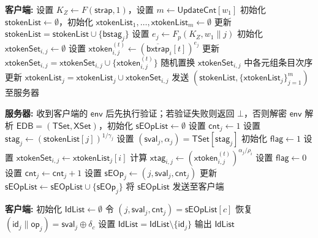 \begin{breakablealgorithm}
\caption{搜索流程 $\mathsf{Search}$}
\label{alg:sse-search}
\begin{algorithmic}[1]
\item[] \textbf{客户端:}
\STATE 设置 $K_Z \leftarrow F(\mathsf{strap},1)$，设置 $m \leftarrow \mathsf{UpdateCnt}[w_1]$
\STATE 初始化 $\mathsf{stokenList}\leftarrow\emptyset$，初始化 $\mathsf{xtokenList}_1,\ldots,\mathsf{xtokenList}_m\leftarrow\emptyset$
  \STATE 更新 $\mathsf{stokenList}=\mathsf{stokenList}\cup\{\mathsf{bstag}_j\}$
  \STATE 设置 $e_j\leftarrow F_p(K_Z,w_1\|j)$
    \STATE 初始化 $\mathsf{xtokenSet}_{i,j}\leftarrow\emptyset$
      \STATE 设置 $\mathsf{xtoken}_{i,j}^{(t)}\leftarrow (\overline{\mathsf{bxtrap}}_i[t])^{e_j}$
      \STATE 更新 $\mathsf{xtokenSet}_{i,j}=\mathsf{xtokenSet}_{i,j}\cup\{\mathsf{xtoken}_{i,j}^{(t)}\}$
    \ENDFOR
    \STATE 随机置换 $\mathsf{xtokenSet}_{i,j}$ 中各元组条目次序
    \STATE 更新 $\mathsf{xtokenList}_j=\mathsf{xtokenList}_j\cup\mathsf{xtokenSet}_{i,j}$
  \ENDFOR
\ENDFOR
\STATE 发送 $(\mathsf{stokenList},\{\mathsf{xtokenList}_j\}_{j=1}^{m})$ 至服务器
\item[] \textbf{服务器:}
\STATE 收到客户端的 $\mathsf{env}$ 后先执行验证；若验证失败则返回 $\bot$，否则解密 $\mathsf{env}$
\STATE 解析 $\mathsf{EDB}=(\mathsf{TSet},\mathsf{XSet})$，初始化 $\mathsf{sEOpList}\leftarrow\emptyset$
  \STATE 设置 $\mathsf{cnt}_j\leftarrow 1$
  \STATE 设置 $\mathsf{stag}_j\leftarrow (\mathsf{stokenList}[j])^{1/\gamma_j}$
  \STATE 设置 $(\mathsf{sval}_j,\alpha_j)=\mathsf{TSet}[\mathsf{stag}_j]$
    \STATE 初始化 $\mathsf{flag}\leftarrow 1$
    \STATE 设置 $\mathsf{xtokenSet}_{i,j}\leftarrow \mathsf{xtokenList}_j[i]$
      \STATE 计算 $\mathsf{xtag}_{i,j}\leftarrow (\mathsf{xtoken}_{i,j}^{(t)})^{\alpha_j/\rho_i}$
        \STATE 设置 $\mathsf{flag}\leftarrow 0$
      \ENDIF
    \ENDFOR
      \STATE 设置 $\mathsf{cnt}_j\leftarrow \mathsf{cnt}_j+1$
    \ENDIF
  \ENDFOR
  \STATE 设置 $\mathsf{sEOp}_j\leftarrow (j,\mathsf{sval}_j,\mathsf{cnt}_j)$
  \STATE 更新 $\mathsf{sEOpList}\leftarrow \mathsf{sEOpList}\cup\{\mathsf{sEOp}_j\}$
\ENDFOR
\STATE 将 $\mathsf{sEOpList}$ 发送至客户端
\item[] \textbf{客户端:}
\STATE 初始化 $\mathsf{IdList}\leftarrow\emptyset$
  \STATE 令 $(j,\mathsf{sval}_j,\mathsf{cnt}_j)=\mathsf{sEOpList}[c]$
  \STATE 恢复 $(\mathsf{id}_j\|\mathsf{op}_j)=\mathsf{sval}_j\oplus\delta_c$
    \STATE 设置 $\mathsf{IdList}=\mathsf{IdList}\setminus\{\mathsf{id}_j\}$
  \ENDIF
\ENDFOR
\STATE 输出 $\mathsf{IdList}$
\end{algorithmic}
\end{breakablealgorithm}
